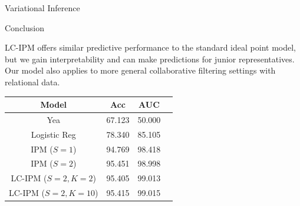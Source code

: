 \documentclass[final]{beamer}
\newlength{\onecolwid}
\begin{document}
\begin{frame}[t]
\begin{columns}[t]
\begin{column}{\onecolwid}
\begin{block}{Variational Inference}
\end{block}




\begin{block}{Conclusion}

LC-IPM offers similar predictive performance to the standard ideal point model, but we gain interpretability and can make predictions for junior representatives. Our model also applies to more general collaborative filtering settings with relational data.

\begin{table}
\vspace{2ex}
\begin{table}
\begin{tabular}{c | c |c |c}
Model &  Acc & AUC\\ %
\hline
\hline
Yea & 67.123 & 50.000\\
Logistic Reg & 78.340 & 85.105\\
\hline
IPM ($S= 1$)  &  94.769 & 98.418\\
IPM ($S= 2$)  & 95.451 & 98.998\\
\hline
LC-IPM ($S=2, K=2$)  & 95.405 & 99.013\\
LC-IPM ($S=2, K=10$)  & 95.415 & 99.015
\end{tabular}
\end{table}


\end{table}
\end{block}
\end{column}
\end{columns}
\end{frame}
\end{document}
